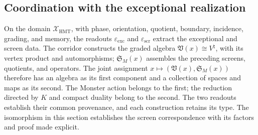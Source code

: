 \subsection{Coordination with the exceptional realization}

On the domain \(\mathcal X_{\mathrm{HMT}}\), with phase, orientation,
quotient, boundary, incidence, grading, and memory, the readouts
\(\varepsilon_{\mathrm{exc}}\) and \(\varepsilon_{\mathrm{scr}}\) extract
the exceptional and screen data. The corridor constructs the graded
algebra \(\mathfrak V(x)\cong V^\natural\), with its vertex product
and automorphisms; \(\mathfrak S_M(x)\) assembles the preceding screens, quotients,
and operators. The joint assignment
\(x\mapsto(\mathfrak V(x),\mathfrak S_M(x))\) therefore has an
algebra as its first component and a collection of spaces and maps as its second.
The Monster action belongs to the first; the reduction directed by \(K\)
and compact duality belong to the second. The two readouts establish their common
provenance, and each construction retains its type.
The isomorphism in this section establishes the screen
correspondence with its factors and proof
made explicit.

